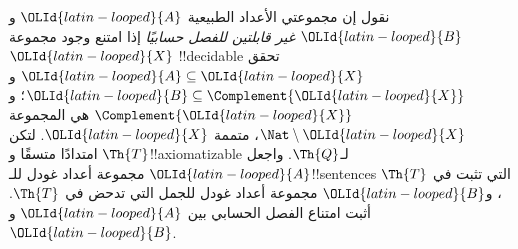 \documentclass[../../../include/open-logic-section]{subfiles}
\begin{document}
\begin{prob}
نقول إن مجموعتي الأعداد الطبيعية $\OLId{latin-looped}{A}$ و$\OLId{latin-looped}{B}$ \emph{غير قابلتين للفصل
حسابيًا} إذا امتنع وجود مجموعة $\OLId{latin-looped}{X}$ !!{decidable} تحقق
$\OLId{latin-looped}{A}\subseteq \OLId{latin-looped}{X}$ و$\OLId{latin-looped}{B}\subseteq\Complement{\OLId{latin-looped}{X}}$؛ و$\Complement{\OLId{latin-looped}{X}}$
هي المجموعة $\Nat\setminus \OLId{latin-looped}{X}$، متممة $\OLId{latin-looped}{X}$.
لتكن $\Th{T}$ امتدادًا متسقًا و!!{axiomatizable} لـ$\Th{Q}$.
واجعل $\OLId{latin-looped}{A}$ مجموعة أعداد غودل للـ!!{sentence}s التي تثبت في
$\Th{T}$، و$\OLId{latin-looped}{B}$ مجموعة أعداد غودل للجمل التي تدحض في $\Th{T}$.
أثبت امتناع الفصل الحسابي بين $\OLId{latin-looped}{A}$ و$\OLId{latin-looped}{B}$.
\end{prob}
\end{document}
